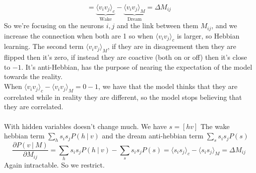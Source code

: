 \documentclass[10pt]{report}
\begin{document}
$$=\underset{\text{Wake}}{\underbrace{\langle v_iv_j\rangle_c}} - \underset{\text{Dream}}{\underbrace{\langle v_iv_j\rangle_M}} = \Delta M_{ij}$$
So we're focusing on the neurons $i, j$ and the link between them $M_{ij}$, and we increase the connection when both are 1 so when $\langle v_iv_j\rangle_c$ is larger, so Hebbian learning. The second term $\langle v_iv_j\rangle_M$, if they are in disagreement then they are flipped then it's zero, if instead they are coactive (both on or off) then it's close to $-1$. It's anti-Hebbian, has the purpose of nearing the expectation of the model towards the reality.\\
When $\langle v_iv_j\rangle_c - \langle v_iv_j\rangle_M = 0-1$, we have that the model thinks that they are correlated while in reality they are different, so the model stops believing that they are correlated.\\\\
With hidden variables doesn't change much. We have $s=[hv]$
The wake hebbian term $\sum_h s_is_jP(h\:|\:v)$ and the dream anti-hebbian term $\sum_ss_is_jP(s)$
$$\frac{\partial P(v\:|\:M)}{\partial M_{ij}} = \sum_h s_is_jP(h\:|\:v) - \sum_ss_is_jP(s) = \langle s_is_j\rangle_c - \langle s_is_j\rangle_M = \Delta M_{ij}$$
Again intractable. So we restrict.
\end{document}
